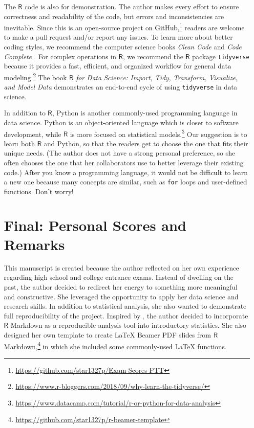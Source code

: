\documentclass[
]{article}
\begin{document}
The \(\mathsf{R}\) code is also for demonstration. The author makes
every effort to ensure correctness and readability of the code, but
errors and inconsistencies are inevitable. Since this is an open-source
project on GitHub,\footnote{\url{https://github.com/star1327p/Exam-Scores-PTT}}
readers are welcome to make a pull request and/or report any issues. To
learn more about better coding styles, we recommend the computer science
books \emph{Clean Code} \citep{martin2009clean} and \emph{Code Complete}
\citep{mcconnell2004code}. For complex operations in \(\mathsf{R}\), we
recommend the \(\mathsf{R}\) package \texttt{tidyverse}
\citep{r-tidyverse} because it provides a fast, efficient, and organized
workflow for general data modeling.\footnote{\url{https://www.r-bloggers.com/2018/09/why-learn-the-tidyverse/}}
The book
\textit{$\mathsf{R}$ for Data Science: Import, Tidy, Transform, Visualize, and Model Data}
\citep{wickham2016r} demonstrates an end-to-end cycle of using
\texttt{tidyverse} in data science.

In addition to \(\mathsf{R}\), Python is another commonly-used
programming language in data science. Python is an object-oriented
language which is closer to software development, while \(\mathsf{R}\)
is more focused on statistical models.\footnote{\url{https://www.datacamp.com/tutorial/r-or-python-for-data-analysis}}
Our suggestion is to learn both \(\mathsf{R}\) and Python, so that the
readers get to choose the one that fits their unique needs. (The author
does not have a strong personal preference, so she often chooses the one
that her collaborators use to better leverage their existing code.)
After you know a programming language, it would not be difficult to
learn a new one because many concepts are similar, such as \texttt{for}
loops and user-defined functions. Don't worry!

\hypertarget{personal-remarks}{%
\section{Final: Personal Scores and Remarks}\label{personal-remarks}}

This manuscript is created because the author reflected on her own
experience regarding high school and college entrance exams. Instead of
dwelling on the past, the author decided to redirect her energy to
something more meaningful and constructive. She leveraged the
opportunity to apply her data science and research skills. In addition
to statistical analysis, she also wanted to demonstrate full
reproducibility of the project. Inspired by
\citet{baumer2014r-markdown}, the author decided to incorporate
\(\mathsf{R}\) Markdown as a reproducible analysis tool into
introductory statistics. She also designed her own template to create
LaTeX Beamer PDF slides from \(\mathsf{R}\) Markdown,\footnote{\url{https://github.com/star1327p/r-beamer-template}}
in which she included some commonly-used LaTeX functions.
\end{document}
